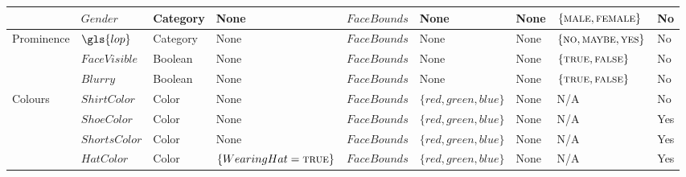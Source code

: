 \begin{landscape}
\begin{table}[p]
{\begin{tabular}{lllllllll}
        &
        $Gender$ &
        Category &
        None &
        $FaceBounds$ &
        None &
        None &
        $\{ \textsc{male}, \textsc{female} \} $&
        No
      \\
      \midrule
        \multirow{2}{*}{Prominence} &
        $\gls{lop}$ &
        Category &
        None &
        $FaceBounds$ &
        None &
        None &
        $\{ \textsc{no}, \textsc{maybe}, \textsc{yes} \}$ &
        No
      \\
        &
        $FaceVisible$ &
        Boolean &
        None &
        $FaceBounds$ &
        None &
        None &
        $\{ \textsc{true}, \textsc{false} \}$&
        No
      \\
        &
        $Blurry$ &
        Boolean &
        None &
        $FaceBounds$ &
        None &
        None &
        $\{ \textsc{true}, \textsc{false} \}$&
        No
      \\
      \midrule
        \multirow{2}{*}{Colours} &
        $ShirtColor$ &
        Color &
        None &
        $FaceBounds$ &
        $\{ red, green, blue \}$ &
        None &
        N/A &
        No
      \\
        &
        $ShoeColor$ &
        Color &
        None &
        $FaceBounds$ &
        $\{ red, green, blue \}$ &
        None &
        N/A &
        Yes
      \\
        &
        $ShortsColor$ &
        Color &
        None &
        $FaceBounds$ &
        $\{ red, green, blue \}$ &
        None &
        N/A &
        Yes
      \\
        &
        $HatColor$ &
        Color &
        $\{ WearingHat = \textsc{true} \}$ &
        $FaceBounds$ &
        $\{ red, green, blue \}$ &
        None &
        N/A &
        Yes
      \\
      \bottomrule
    \end{tabular}
  }
\end{table}

\end{landscape}